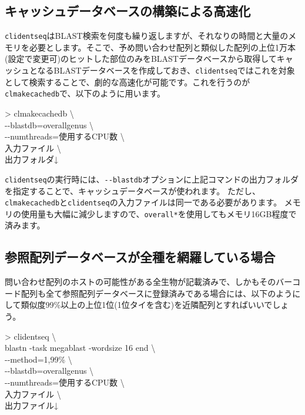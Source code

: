 \documentclass[titlepage,10pt,a4paper]{jsbook}
\newenvironment{cmd}{\begin{oframed}\raggedright\ttfamily\footnotesize\setlength{\baselineskip}{1.4em}}{\end{oframed}\vspace{-1em}}
\begin{document}
\subsection{キャッシュデータベースの構築による高速化}

\texttt{clidentseq}はBLAST検索を何度も繰り返しますが、それなりの時間と大量のメモリを必要とします。そこで、予め問い合わせ配列と類似した配列の上位1万本(設定で変更可)のヒットした部位のみをBLASTデータベースから取得してキャッシュとなるBLASTデータベースを作成しておき、\texttt{clidentseq}ではこれを対象として検索することで、劇的な高速化が可能です。これを行うのが\texttt{clmakecachedb}で、以下のように用います。

\begin{cmd}
{\textgreater} clmakecachedb {\textbackslash}\\
{-}{-}blastdb=overall{\textunderscore}genus {\textbackslash}\\
{-}{-}numthreads=使用するCPU数 {\textbackslash}\\
入力ファイル {\textbackslash}\\
出力フォルダ↓
\end{cmd}

\texttt{clidentseq}の実行時には、\texttt{{-}{-}blastdb}オプションに上記コマンドの出力フォルダを指定することで、キャッシュデータベースが使われます。
ただし、\texttt{clmakecachedb}と\texttt{clidentseq}の入力ファイルは同一である必要があります。
メモリの使用量も大幅に減少しますので、\texttt{overall{\textunderscore}*}を使用してもメモリ16GB程度で済みます。

\subsection{参照配列データベースが全種を網羅している場合}\label{subsection:completereferencedatabase}

問い合わせ配列のホストの可能性がある全生物が記載済みで、しかもそのバーコード配列も全て参照配列データベースに登録済みである場合には、以下のようにして類似度99\%以上の上位1位(1位タイを含む)を近隣配列とすればいいでしょう。
\begin{cmd}
{\textgreater} clidentseq {\textbackslash}\\
blastn -task megablast -word{\textunderscore}size 16 end {\textbackslash}\\
{-}{-}method=1,99\% {\textbackslash}\\
{-}{-}blastdb=overall{\textunderscore}genus {\textbackslash}\\
{-}{-}numthreads=使用するCPU数 {\textbackslash}\\
入力ファイル {\textbackslash}\\
出力ファイル↓
\end{cmd}
\end{document}
